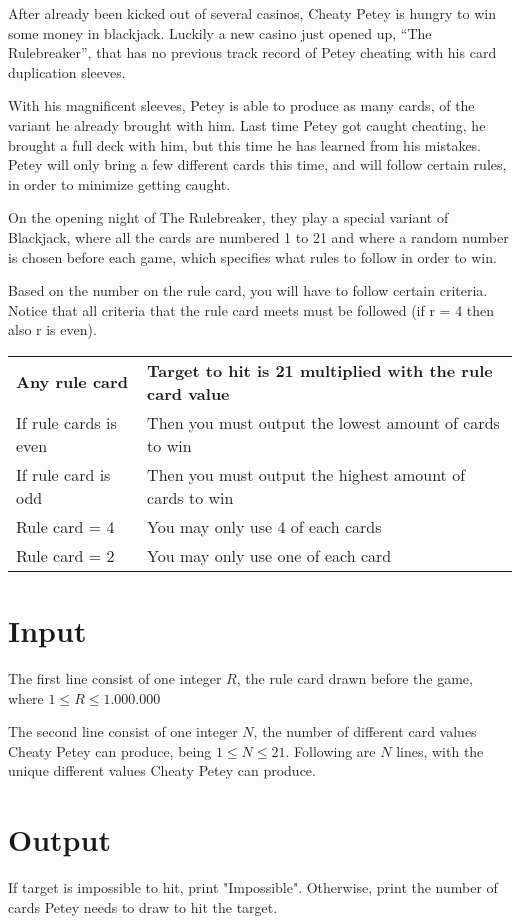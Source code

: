 
After already been kicked out of several casinos, Cheaty Petey is hungry to win some money in blackjack. Luckily a new casino just opened up, “The Rulebreaker”, that has no previous track record of Petey cheating with his card duplication sleeves.

With his magnificent sleeves, Petey is able to produce as many cards, of the variant he already brought with him. Last time Petey got caught cheating, he brought a full deck with him, but this time he has learned from his mistakes. Petey will only bring a few different cards this time, and will follow certain rules, in order to minimize getting caught.

On the opening night of The Rulebreaker, they play a special variant of Blackjack, where all the cards are numbered 1 to 21 and where a random number is chosen before each game, which specifies what rules to follow in order to win. 

Based on the number on the rule card, you will have to follow certain criteria. Notice that all criteria that the rule card meets must be followed (if r = 4 then also r is even). 
\begin{table}[]
    \begin{tabular}{ll}
    \textbf{Any rule card} & \textbf{Target to hit is 21 multiplied with the rule card value} \\
    If rule cards is even & Then you must output the lowest amount of cards to win  \\
    If rule card is odd   & Then you must output the highest amount of cards to win \\
    Rule card = 4         & You may only use 4 of each cards                        \\
    Rule card = 2         & You may only use one of each card                      
    \end{tabular}
\end{table}

\section*{Input}
The first line consist of one integer $R$, the rule card drawn before the game, where 
$1\leq R \leq 1.000.000$



The second line consist of one integer $N$, the number of different card values Cheaty Petey can produce, being $1\leq N \leq 21$. Following are $N$ lines, with the unique different values Cheaty Petey can produce.

\section*{Output}
If target is impossible to hit, print "Impossible". Otherwise, print the number of cards Petey needs to draw to hit the target.
